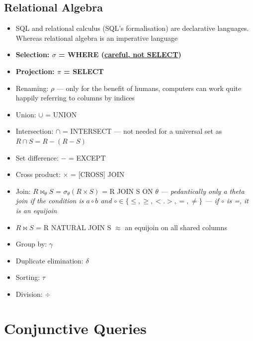 \documentclass[20pt,a4paper,landscape]{extarticle}
\begin{document}
\begin{flushleft}
\subsection{Relational Algebra}
\begin{itemize}
\item SQL and relational calculus (SQL's formalisation) are declarative languages. Whereas relational algebra is an imperative language
\item \textbf{Selection: \boldmath$\sigma$ = WHERE (\underline{careful, not SELECT})}
\item \textbf{Projection: \boldmath$\pi$ = SELECT}
\item Renaming: $\rho$ --- only for the benefit of humans, computers can work quite happily referring to columns by indices
\item Union: $\cup$ = UNION
\item Intersection: $\cap$ = INTERSECT --- not needed for a universal set as $R \cap S = R - (R - S)$
\item Set difference: $-$ = EXCEPT
\item Cross product: $\times$ = [CROSS] JOIN
\item Join: $R \bowtie_\theta S$ = $\sigma_\theta(R \times S)$ = R JOIN S ON $\theta$ \textit{--- pedantically only a theta join if the condition is $a \circ b$ and $\circ \in \{\leq, \geq, <. >, =, \neq\}$ --- if $\circ$ is =, it is an equijoin}
\item $R \bowtie S$ = R NATURAL JOIN S $\approx$ an equijoin on all shared columns
\item Group by: $\gamma$
\item Duplicate elimination: $\delta$
\item Sorting: $\tau$
\item Division: $\div$
\end{itemize}
\clearpage
\section{Conjunctive Queries}

\end{flushleft}
\end{document}
